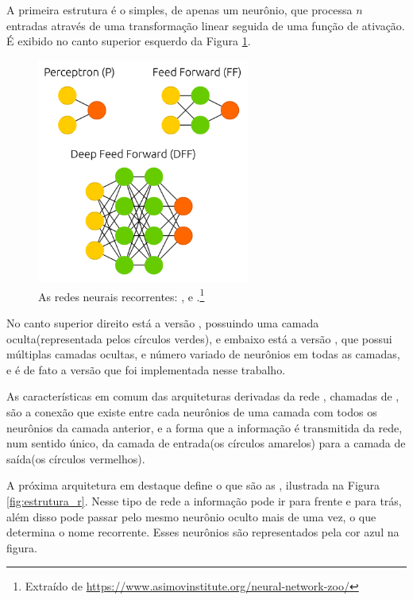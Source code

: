 A primeira estrutura é o  simples, de apenas um neurônio, que processa $n$ entradas através de uma transformação linear seguida de uma função de ativação. É exibido no canto superior esquerdo da Figura \ref{fig:estrutura_p}.

\begin{figure}[htb]
\centering
\includegraphics[width=7cm]{figuras/estrutura_p}
\caption{As redes neurais recorrentes: ,  e .\footnote{Extraído de \url{https://www.asimovinstitute.org/neural-network-zoo/}}}
\label{fig:estrutura_p}
\end{figure}

No canto superior direito está a versão , possuindo uma camada oculta(representada pelos círculos verdes), e embaixo está a versão , que possui múltiplas camadas ocultas, e número variado de neurônios em todas as camadas, e é de fato a versão que foi implementada nesse trabalho.

As características em comum das arquiteturas derivadas da rede , chamadas de , são a conexão que existe entre cada neurônios de uma camada com todos os neurônios da camada anterior, e a forma que a informação é transmitida da rede, num sentido único, da camada de entrada(os círculos amarelos) para a camada de saída(os círculos vermelhos).

A próxima arquitetura em destaque define o que são as , ilustrada na Figura \ref{fig:estrutura_r}. Nesse tipo de rede a informação pode ir para frente e para trás, além disso pode passar pelo mesmo neurônio oculto mais de uma vez, o que determina o nome recorrente. Esses neurônios são representados pela cor azul na figura.

